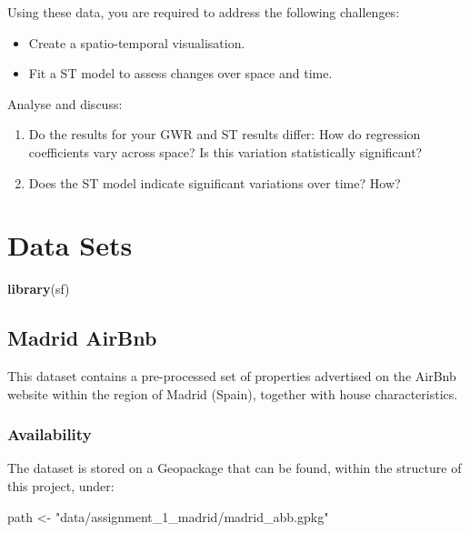 \documentclass[
]{book}
\newenvironment{Shaded}{\begin{snugshade}}{\end{snugshade}}
\newcommand{\KeywordTok}[1]{\textcolor[rgb]{0.13,0.29,0.53}{\textbf{#1}}}
\newcommand{\NormalTok}[1]{#1}
\newcommand{\StringTok}[1]{\textcolor[rgb]{0.31,0.60,0.02}{#1}}
\providecommand{\tightlist}{%
  \setlength{\itemsep}{0pt}\setlength{\parskip}{0pt}}
\begin{document}
Using these data, you are required to address the following challenges:

\begin{itemize}
\item
  Create a spatio-temporal visualisation.
\item
  Fit a ST model to assess changes over space and time.
\end{itemize}

Analyse and discuss:

\begin{enumerate}
\def\labelenumi{\arabic{enumi}.}
\tightlist
\item
  Do the results for your GWR and ST results differ: How do regression coefficients vary across space? Is this
  variation statistically significant?
\item
  Does the ST model indicate significant variations over time? How?
\end{enumerate}

\hypertarget{datasets}{%
\chapter{Data Sets}\label{datasets}}

\begin{Shaded}
\begin{Highlighting}[]
\KeywordTok{library}\NormalTok{(sf)}
\end{Highlighting}
\end{Shaded}

\hypertarget{madrid-airbnb}{%
\section{Madrid AirBnb}\label{madrid-airbnb}}

This dataset contains a pre-processed set of properties advertised on the AirBnb website within the region of Madrid (Spain), together with house characteristics.

\hypertarget{availability}{%
\subsection*{Availability}\label{availability}}

The dataset is stored on a Geopackage that can be found, within the structure of this project, under:

\begin{Shaded}
\begin{Highlighting}[]
\NormalTok{path <-}\StringTok{ "data/assignment_1_madrid/madrid_abb.gpkg"}
\end{Highlighting}
\end{Shaded}
\end{document}
